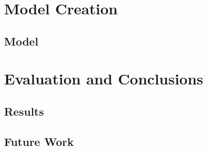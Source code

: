 \documentclass[12pt]{article}
\begin{document}
    \section{Model Creation}
        \subsection{Model}
    \section{Evaluation and Conclusions}
        \subsection{Results}
        \subsection{Future Work}
\end{document}
